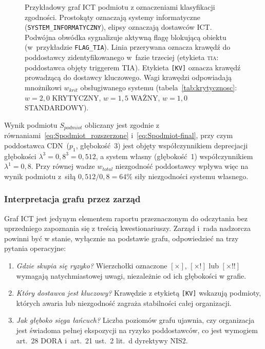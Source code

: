 \begin{figure}[htbp]
  \caption{Przykładowy graf ICT podmiotu z oznaczeniami klasyfikacji zgodności.
    Prostokąty oznaczają systemy informatyczne (\texttt{SYSTEM\_INFORMATYCZNY}), elipsy oznaczają dostawców ICT.
    Podwójna obwódka sygnalizuje aktywną flagę blokującą obiektu (w~przykładzie \texttt{FLAG\_TIA}).
    Linia przerywana oznacza krawędź do poddostawcy zidentyfikowanego w~fazie trzeciej (etykieta \textsc{tia}: poddostawca objęty triggerem TIA). Etykieta \texttt{[KV]} oznacza
    krawędź prowadzącą do dostawcy kluczowego. Wagi krawędzi odpowiadają mnożnikowi $w_{krit}$
    obsługiwanego systemu (tabela~\ref{tab:krytycznosc}: $w\!=\!2{,}0$ KRYTYCZNY, $w\!=\!1{,}5$ WAŻNY,
    $w\!=\!1{,}0$ STANDARDOWY).}
  \label{fig:przykladowy-graf-ict}
\end{figure}




Wynik podmiotu $S_{podmiot}$ obliczany jest zgodnie z równaniami~\eqref{eq:Spodmiot_rozszerzone} i~\eqref{eq:Spodmiot-final}, przy czym poddostawca CDN~($p_1$, głębokość~3) jest objęty współczynnikiem deprecjacji głębokości $\lambda^{3} = 0{,}8^3 = 0{,}512$, a system własny (głębokość~1) współczynnikiem $\lambda^{1} = 0{,}8$. Przy równej wadze $w_{total}$ niezgodność poddostawcy wpływa więc na wynik podmiotu z~siłą $0{,}512 / 0{,}8 = 64\%$ siły niezgodności systemu własnego.

\subsubsection{Interpretacja grafu przez zarząd}
\label{sec:interpretacja-grafu}

Graf ICT jest jedynym elementem raportu przeznaczonym do odczytania bez uprzedniego zapoznania się z treścią kwestionariuszy. Zarząd i~rada nadzorcza powinni być w stanie, wyłącznie na podstawie grafu, odpowiedzieć na trzy pytania operacyjne:

\begin{enumerate}[label=(\roman*)]
    \item \textit{Gdzie skupia się ryzyko?} Wierzchołki oznaczone $[\times]$, $[\times!]$ lub $[\times!!]$ wymagają natychmiastowej uwagi, niezależnie od ich głębokości w grafie.
    \item \textit{Który dostawca jest kluczowy?} Krawędzie z etykietą \texttt{[KV]} wskazują podmioty, których awaria lub niezgodność zagraża stabilności całej organizacji.
    \item \textit{Jak głęboko sięga łańcuch?} Liczba poziomów grafu ujawnia, czy organizacja jest świadoma pełnej ekspozycji na ryzyko poddostawców, co jest wymogiem art.~28 DORA i~art.~21 ust.~2 lit.~d dyrektywy NIS2.
\end{enumerate}

